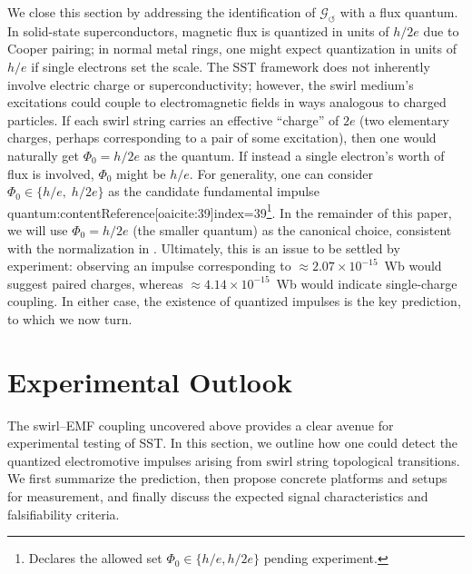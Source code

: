 \documentclass[12pt]{article}
\begin{document}
        We close this section by addressing the identification of $\mathcal{G}_{\!\boldsymbol{\circlearrowleft}}$ with a flux quantum. In solid-state superconductors, magnetic flux is quantized in units of $h/2e$ due to Cooper pairing; in normal metal rings, one might expect quantization in units of $h/e$ if single electrons set the scale. The SST framework does not inherently involve electric charge or superconductivity; however, the swirl medium's excitations could couple to electromagnetic fields in ways analogous to charged particles. If each swirl string carries an effective ``charge'' of $2e$ (two elementary charges, perhaps corresponding to a pair of some excitation), then one would naturally get $\Phi_{0}=h/2e$ as the quantum. If instead a single electron's worth of flux is involved, $\Phi_{0}$ might be $h/e$. For generality, one can consider $\Phi_{0}\in\{h/e,\;h/2e\}$ as the candidate fundamental impulse quantum:contentReference[oaicite:39]{index=39}\footnote{Declares the allowed set $\Phi_0\in\{h/e,h/2e\}$ pending experiment.}. In the remainder of this paper, we will use $\Phi_{0}=h/2e$ (the smaller quantum) as the canonical choice, consistent with the normalization in \cite{Iskandarani2025RotatingFrame,Iskandarani2025FluxComp}. Ultimately, this is an issue to be settled by experiment: observing an impulse corresponding to $\approx2.07\times10^{-15}$~Wb would suggest paired charges, whereas $\approx4.14\times10^{-15}$~Wb would indicate single-charge coupling. In either case, the existence of quantized impulses is the key prediction, to which we now turn.

\section{Experimental Outlook}\label{sec:experimental}
    The swirl–EMF coupling uncovered above provides a clear avenue for experimental testing of SST. In this section, we outline how one could detect the quantized electromotive impulses arising from swirl string topological transitions. We first summarize the prediction, then propose concrete platforms and setups for measurement, and finally discuss the expected signal characteristics and falsifiability criteria.
\end{document}
